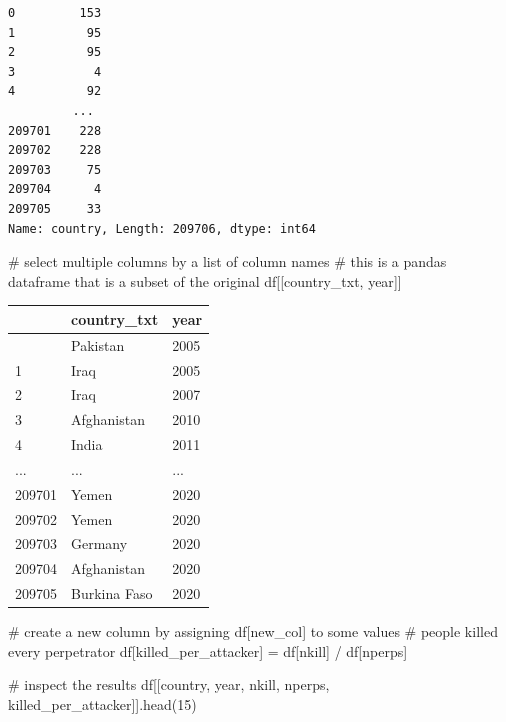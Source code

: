 \documentclass[
  letterpaper,
  DIV=11,
  numbers=noendperiod]{scrreprt}
\newenvironment{Shaded}{\begin{snugshade}}{\end{snugshade}}
\newcommand{\CommentTok}[1]{\textcolor[rgb]{0.37,0.37,0.37}{#1}}
\newcommand{\DecValTok}[1]{\textcolor[rgb]{0.68,0.00,0.00}{#1}}
\newcommand{\NormalTok}[1]{\textcolor[rgb]{0.00,0.23,0.31}{#1}}
\newcommand{\OperatorTok}[1]{\textcolor[rgb]{0.37,0.37,0.37}{#1}}
\newcommand{\StringTok}[1]{\textcolor[rgb]{0.13,0.47,0.30}{#1}}
\begin{document}
\begin{verbatim}
0         153
1          95
2          95
3           4
4          92
         ... 
209701    228
209702    228
209703     75
209704      4
209705     33
Name: country, Length: 209706, dtype: int64
\end{verbatim}

\begin{Shaded}
\begin{Highlighting}[]
\CommentTok{\# select multiple columns by a list of column names}
\CommentTok{\# this is a pandas dataframe that is a subset of the original}
\NormalTok{df[[}\StringTok{\textquotesingle{}country\_txt\textquotesingle{}}\NormalTok{, }\StringTok{\textquotesingle{}year\textquotesingle{}}\NormalTok{]]}
\end{Highlighting}
\end{Shaded}

\begin{longtable}[]{@{}lll@{}}
\toprule\noalign{}
& country\_txt & year \\
\midrule\noalign{}
\endhead
\bottomrule\noalign{}
\endlastfoot
0 & Pakistan & 2005 \\
1 & Iraq & 2005 \\
2 & Iraq & 2007 \\
3 & Afghanistan & 2010 \\
4 & India & 2011 \\
... & ... & ... \\
209701 & Yemen & 2020 \\
209702 & Yemen & 2020 \\
209703 & Germany & 2020 \\
209704 & Afghanistan & 2020 \\
209705 & Burkina Faso & 2020 \\
\end{longtable}

\begin{Shaded}
\begin{Highlighting}[]
\CommentTok{\# create a new column by assigning df[\textquotesingle{}new\_col\textquotesingle{}] to some values}
\CommentTok{\# people killed every perpetrator }
\NormalTok{df[}\StringTok{\textquotesingle{}killed\_per\_attacker\textquotesingle{}}\NormalTok{] }\OperatorTok{=}\NormalTok{ df[}\StringTok{\textquotesingle{}nkill\textquotesingle{}}\NormalTok{] }\OperatorTok{/}\NormalTok{ df[}\StringTok{\textquotesingle{}nperps\textquotesingle{}}\NormalTok{]}

\CommentTok{\# inspect the results}
\NormalTok{df[[}\StringTok{\textquotesingle{}country\textquotesingle{}}\NormalTok{, }\StringTok{\textquotesingle{}year\textquotesingle{}}\NormalTok{, }\StringTok{\textquotesingle{}nkill\textquotesingle{}}\NormalTok{, }\StringTok{\textquotesingle{}nperps\textquotesingle{}}\NormalTok{, }\StringTok{\textquotesingle{}killed\_per\_attacker\textquotesingle{}}\NormalTok{]].head(}\DecValTok{15}\NormalTok{)}
\end{Highlighting}
\end{Shaded}
\end{document}
